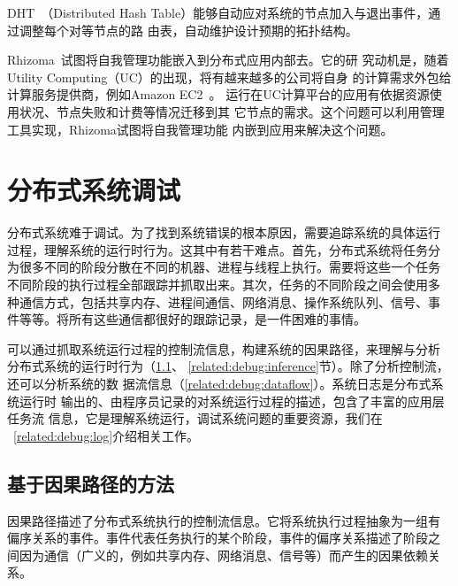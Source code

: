 DHT~\cite{can, pastry, tapestry, chord, kademlia}（Distributed Hash
Table）能够自动应对系统的节点加入与退出事件，通过调整每个对等节点的路
由表，自动维护设计预期的拓扑结构。

Rhizoma~\cite{Rhizoma}试图将自我管理功能嵌入到分布式应用内部去。它的研
究动机是，随着Utility Computing（UC）的出现，将有越来越多的公司将自身
的计算需求外包给计算服务提供商，例如Amazon EC2~\cite{Garfinkel2007}。
运行在UC计算平台的应用有依据资源使用状况、节点失败和计费等情况迁移到其
它节点的需求。这个问题可以利用管理工具实现，Rhizoma试图将自我管理功能
内嵌到应用来解决这个问题。


\section{分布式系统调试}

分布式系统难于调试。为了找到系统错误的根本原因，需要追踪系统的具体运行
过程，理解系统的运行时行为。这其中有若干难点。首先，分布式系统将任务分
为很多不同的阶段分散在不同的机器、进程与线程上执行。需要将这些一个任务
不同阶段的执行过程全部跟踪并抓取出来。其次，任务的不同阶段之间会使用多
种通信方式，包括共享内存、进程间通信、网络消息、操作系统队列、信号、事
件等等。将所有这些通信都很好的跟踪记录，是一件困难的事情。

% 
% 
% 

可以通过抓取系统运行过程的控制流信息，构建系统的因果路径，来理解与分析
分布式系统的运行时行为（\ref{related:debug:casual}、
\ref{related:debug:inference}节）。除了分析控制流，还可以分析系统的数
据流信息（\ref{related:debug:dataflow}）。系统日志是分布式系统运行时
输出的、由程序员记录的对系统运行过程的描述，包含了丰富的应用层任务流
信息，它是理解系统运行，调试系统问题的重要资源，我们在
~\ref{related:debug:log}介绍相关工作。

\subsection{基于因果路径的方法}
\label{related:debug:casual}

因果路径描述了分布式系统执行的控制流信息。它将系统执行过程抽象为一组有
偏序关系的事件。事件代表任务执行的某个阶段，事件的偏序关系描述了阶段之
间因为通信（广义的，例如共享内存、网络消息、信号等）而产生的因果依赖关
系。

